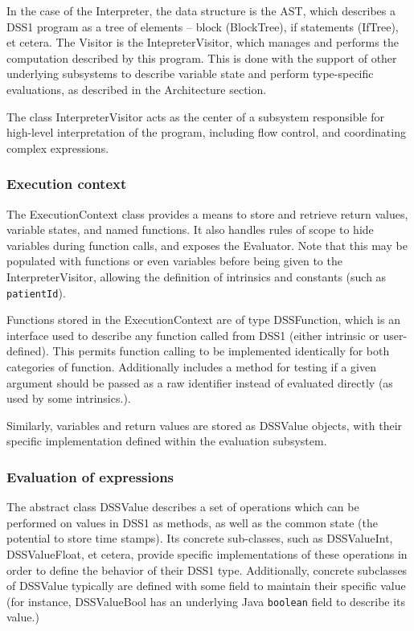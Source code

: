 \documentclass[12pt,letterpaper]{article}
\begin{document}
{	In the case of the Interpreter, the data structure is the AST, which describes a DSS1 program as a tree of elements – block (BlockTree), if statements (IfTree), et cetera. The Visitor is the IntepreterVisitor, which manages and performs the computation described by this program. This is done with the support of other underlying subsystems to describe variable state and perform type-specific evaluations, as described in the Architecture section.

	The class InterpreterVisitor acts as the center of a subsystem  responsible for high-level interpretation of the program, including flow control, and coordinating complex expressions.

\subsubsection{Execution context} \label{sec:EXECUTION_CONTEXT}

The ExecutionContext class provides a means to store and retrieve return values, variable states, and named functions. It also handles rules of scope to hide variables during function calls, and exposes the Evaluator. Note that this may be populated with functions or even variables before being given to the InterpreterVisitor, allowing the definition of intrinsics and constants (such as \texttt{patientId}).

Functions stored in the ExecutionContext are of type DSSFunction, which is an interface used to describe any function called from DSS1 (either intrinsic or user-defined). This permits function calling to be implemented identically for both categories of function. Additionally includes a method for testing if a given argument should be passed as a raw identifier instead of evaluated directly (as used by some intrinsics.).

Similarly, variables and return values are stored as DSSValue 
objects, with their specific implementation defined within the 
evaluation subsystem.

\subsubsection{Evaluation of expressions} \label{sec:EVALUATION}

The abstract class DSSValue describes a set of operations which can be performed on values in DSS1 as methods, as well as the common state (the potential to store time stamps). Its concrete sub-classes, such as DSSValueInt, DSSValueFloat, et cetera, provide specific implementations of these operations in order to define the behavior of their DSS1 type. Additionally, concrete subclasses of DSSValue typically are defined with some field to maintain their specific value (for instance, DSSValueBool has an underlying Java \texttt{boolean} field to describe its value.)

}
\end{document}
